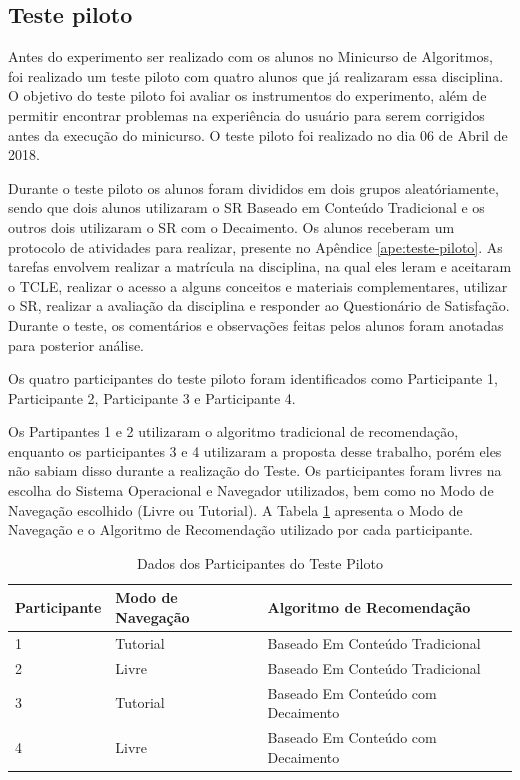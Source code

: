 \subsection{Teste piloto}\label{section:planejamento-teste-piloto}

Antes do experimento ser realizado com os alunos no Minicurso de Algoritmos, foi realizado um teste piloto com
quatro alunos que já realizaram essa disciplina. O objetivo do teste piloto foi avaliar os instrumentos do experimento,
além de permitir encontrar problemas na experiência do usuário para serem corrigidos antes da execução do minicurso. O teste piloto
foi realizado no dia 06 de Abril de 2018.

Durante o teste piloto os alunos foram divididos em dois grupos aleatóriamente, sendo que dois alunos utilizaram o SR
Baseado em Conteúdo Tradicional e os outros dois utilizaram o SR com o Decaimento. Os alunos receberam
um protocolo de atividades para realizar, presente no Apêndice \ref{ape:teste-piloto}. As tarefas envolvem
realizar a matrícula na disciplina, na qual eles leram e aceitaram o TCLE, realizar o acesso a alguns conceitos e
materiais complementares, utilizar o SR, realizar a avaliação da disciplina e responder ao Questionário
de Satisfação. Durante o teste, os comentários e observações feitas pelos alunos foram anotadas para posterior análise.

Os quatro participantes do teste piloto foram identificados como Participante 1, Participante 2,
Participante 3 e Participante 4.

Os Partipantes 1 e 2 utilizaram o algoritmo tradicional de recomendação, enquanto os participantes 3 e 4 utilizaram a
proposta desse trabalho, porém eles não sabiam disso durante a realização do Teste. Os participantes foram livres na
escolha do Sistema Operacional e Navegador utilizados, bem como no Modo de Navegação escolhido (Livre ou Tutorial).
A Tabela \ref{tab:participantes-teste-piloto} apresenta o Modo de Navegação e o Algoritmo de Recomendação utilizado por
cada participante.

\begin{table}[h]
\footnotesize
\caption[Dados dos Participantes do Teste Piloto]{Dados dos Participantes do Teste Piloto}
\label{tab:participantes-teste-piloto}
\centering
\begin{tabular}{|p{2cm}|p{2.5cm}|p{2.5cm}|}
  \hline
  \textbf{Participante} & \textbf{Modo de Navegação} & \textbf{Algoritmo de Recomendação} \\
  \hline
  1 & Tutorial & Baseado Em Conteúdo Tradicional \\
  \hline
  2 & Livre & Baseado Em Conteúdo Tradicional \\
  \hline
  3 & Tutorial & Baseado Em Conteúdo com Decaimento \\
  \hline
  4 & Livre & Baseado Em Conteúdo com Decaimento \\
  \hline
\end{tabular}
\end{table}

